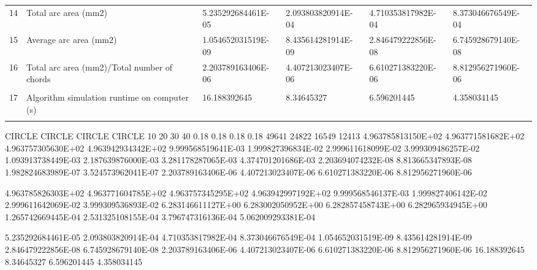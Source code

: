 \begin{tabular}{ p{0.5cm} p{8.0cm} p{4.00cm} p{4.0cm} p{4.00cm} p{4.0cm}}
14	& Total arc area (mm2)	                               & 5.235292684461E-05	& 2.093803820914E-04   & 4.710353817982E-04	& 8.373046676549E-04 \\
15	& Average arc area (mm2)	                           & 1.054652031519E-09	& 8.435614281914E-09   & 2.846479222856E-08	& 6.745928679140E-08 \\
16	& Total arc area (mm2)/Total number of chords	       & 2.203789163406E-06	& 4.407213023407E-06   & 6.610271383220E-06	& 8.812956271960E-06 \\
	&                                                      &                    &                      &                    & \\
17	& Algorithm simulation runtime on computer (s)         & 16.188392645	    & 8.34645327	       & 6.596201445	    & 4.358034145 \\
	&                                                      &                    &                      &                    & 
\end{tabular}


CIRCLE	CIRCLE	CIRCLE	CIRCLE
10	20	30	40
0.18	0.18	0.18	0.18
49641	24822	16549	12413
4.963785813150E+02	4.963771581682E+02	4.963757305630E+02	4.963942934342E+02
9.999568519641E-03	1.999827396834E-02	2.999611618099E-02	3.999309486257E-02
1.093913738449E-03	2.187639876000E-03	3.281178287065E-03	4.374701201686E-03
2.203694074232E-08	8.813665347893E-08	1.982824683989E-07	3.524573962041E-07
2.203789163406E-06	4.407213023407E-06	6.610271383220E-06	8.812956271960E-06

4.963785826303E+02	4.963771604785E+02	4.963757345295E+02	4.963942997192E+02
9.999568546137E-03	1.999827406142E-02	2.999611642069E-02	3.999309536893E-02
6.283146611127E+00	6.283002050952E+00	6.282857458743E+00	6.282965934945E+00
1.265742669445E-04	2.531325108155E-04	3.796747316136E-04	5.062009293381E-04

5.235292684461E-05	2.093803820914E-04	4.710353817982E-04	8.373046676549E-04
1.054652031519E-09	8.435614281914E-09	2.846479222856E-08	6.745928679140E-08
2.203789163406E-06	4.407213023407E-06	6.610271383220E-06	8.812956271960E-06
16.188392645	8.34645327	6.596201445	4.358034145


